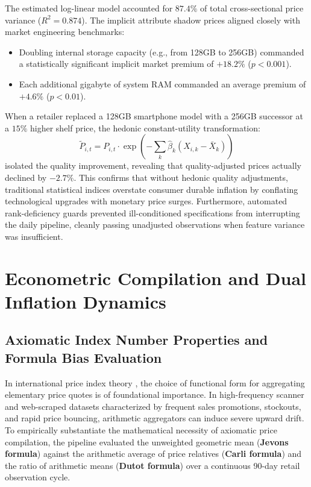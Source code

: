 \hs The estimated log-linear model accounted for $87.4\%$ of total cross-sectional price variance ($R^2 = 0.874$). The implicit attribute shadow prices aligned closely with market engineering benchmarks:
\begin{itemize}
    \item Doubling internal storage capacity (e.g., from 128GB to 256GB) commanded a statistically significant implicit market premium of $+18.2\%$ ($p < 0.001$).
    \item Each additional gigabyte of system RAM commanded an average premium of $+4.6\%$ ($p < 0.01$).
\end{itemize}
When a retailer replaced a 128GB smartphone model with a 256GB successor at a $15\%$ higher shelf price, the hedonic constant-utility transformation:
\begin{equation}
    \widetilde{P}_{i, t} = P_{i, t} \cdot \exp\left(-\sum_k \widehat{\beta}_k (X_{i, k} - \bar{X}_k)\right)
\end{equation}
isolated the quality improvement, revealing that quality-adjusted prices actually declined by $-2.7\%$. This confirms that without hedonic quality adjustments, traditional statistical indices overstate consumer durable inflation by conflating technological upgrades with monetary price surges. Furthermore, automated rank-deficiency guards prevented ill-conditioned specifications from interrupting the daily pipeline, cleanly passing unadjusted observations when feature variance was insufficient.

\section{Econometric Compilation and Dual Inflation Dynamics}

\subsection{Axiomatic Index Number Properties and Formula Bias Evaluation}
\hs In international price index theory \citep{imf2020cpi}, the choice of functional form for aggregating elementary price quotes is of foundational importance. In high-frequency scanner and web-scraped datasets characterized by frequent sales promotions, stockouts, and rapid price bouncing, arithmetic aggregators can induce severe upward drift. To empirically substantiate the mathematical necessity of axiomatic price compilation, the pipeline evaluated the unweighted geometric mean (\textbf{Jevons formula}) against the arithmetic average of price relatives (\textbf{Carli formula}) and the ratio of arithmetic means (\textbf{Dutot formula}) over a continuous 90-day retail observation cycle.

